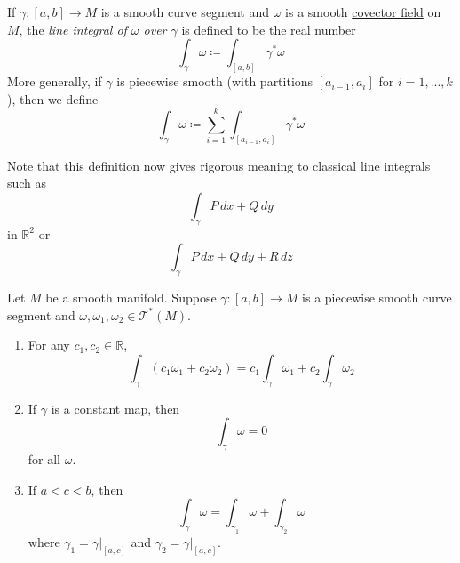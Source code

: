\documentclass{article}
\newcounter{theorem}[section]
\newcounter{definition}[section]
\begin{document}
    \begin{definition}
      \label{def:line-integral-of-omega-over-gamma}
    If $\gamma: [a,b] \to M$ is a smooth curve segment and $\omega$ is a smooth \hyperref[def:covector-field]{covector field} on $M$, the \textit{line integral of $\omega$ over $\gamma$} is defined to be the real number
    \begin{equation}
      \int_\gamma \omega \coloneqq \int_{[a,b]} \gamma^* \omega
    \end{equation}
    More generally, if $\gamma$ is piecewise smooth (with partitions $[a_{i-1}, a_i]$ for $i = 1, ..., k$), then we define
    \begin{equation}
      \int_\gamma \omega \coloneqq \sum_{i=1}^k \int_{[a_{i-1}, a_i]} \gamma^* \omega
    \end{equation}
    \end{definition}

    Note that this definition now gives rigorous meaning to classical line integrals such as 
    \begin{equation}
      \int_\gamma P \,dx + Q\,dy
    \end{equation}
    in $\mathbb{R}^2$ or 
    \begin{equation}
      \int_\gamma P\,dx + Q\,dy + R\,dz
    \end{equation}

    \begin{theorem}
      \label{thm:properties-of-line-integrals}
    Let $M$ be a smooth manifold. Suppose $\gamma: [a,b] \to M$ is a piecewise smooth curve segment and $\omega, \omega_1, \omega_2 \in \mathcal{T}^* (M)$. 
    \begin{enumerate}
        \item For any $c_1, c_2 \in \mathbb{R}$, 
        \begin{equation}
          \int_\gamma (c_1 \omega_1 + c_2 \omega_2) = c_1 \int_\gamma \omega_1 + c_2 \int_\gamma \omega_2
        \end{equation}
        \item If $\gamma$ is a constant map, then 
        \begin{equation}
          \int_\gamma \omega = 0
        \end{equation}
        for all $\omega$. 
        \item If $a < c < b$, then 
        \begin{equation}
          \int_\gamma \omega = \int_{\gamma_1} \omega + \int_{\gamma_2} \omega
        \end{equation}
        where $\gamma_1 = \gamma \big|_{[a,c]}$ and $\gamma_2 = \gamma \big|_{[a,c]}$. 
    \end{enumerate}
    \end{theorem}
\end{document}
